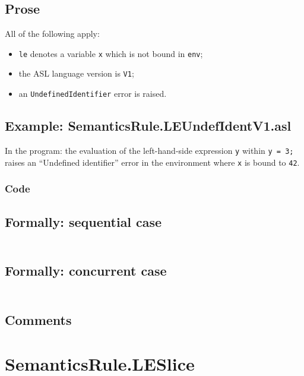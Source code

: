 \documentclass{book}
\begin{document}
    \subsection{Prose}
    All of the following apply:
    \begin{itemize}
    \item \texttt{le} denotes a variable \texttt{x} which is not bound in \texttt{env};
    \item the ASL language version is \texttt{V1};
    \item an \texttt{UndefinedIdentifier} error is raised.
    \end{itemize}

    \subsection{Example: SemanticsRule.LEUndefIdentV1.asl}
    In the program:
    the evaluation of the left-hand-side expression \texttt{y} within \texttt{y
= 3;} raises an ``Undefined identifier'' error in the environment where
\texttt{x} is bound to \texttt{42}.

  \subsubsection{Code}

  \subsection{Formally: sequential case}
  \begin{align}
  \end{align} 

  \subsection{Formally: concurrent case}
  \begin{align}
  \end{align} 

    \subsection{Comments}

\section{SemanticsRule.LESlice \label{sec:SemanticsRule.LESlice}}
\end{document}
